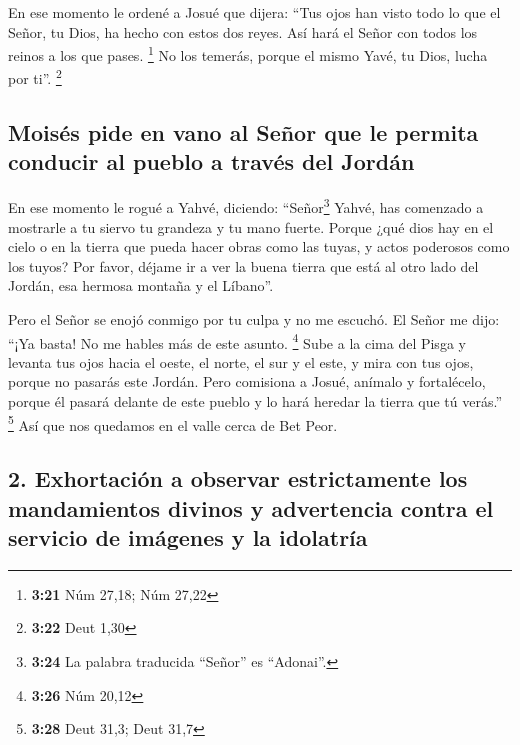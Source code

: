  En ese momento le ordené a Josué que dijera: ``Tus ojos
han visto todo lo que el Señor, tu Dios, ha hecho con estos dos reyes.
Así hará el Señor con todos los reinos a los que pases. \footnote{\textbf{3:21}
  Núm 27,18; Núm 27,22}  No los temerás, porque el mismo
Yavé, tu Dios, lucha por ti''. \footnote{\textbf{3:22} Deut 1,30}

\hypertarget{moisuxe9s-pide-en-vano-al-seuxf1or-que-le-permita-conducir-al-pueblo-a-travuxe9s-del-jorduxe1n}{%
\subsection{Moisés pide en vano al Señor que le permita conducir al
pueblo a través del
Jordán}\label{moisuxe9s-pide-en-vano-al-seuxf1or-que-le-permita-conducir-al-pueblo-a-travuxe9s-del-jorduxe1n}}

 En ese momento le rogué a Yahvé, diciendo:
 ``Señor\footnote{\textbf{3:24} La palabra traducida
  ``Señor'' es ``Adonai''.} Yahvé, has comenzado a mostrarle a tu siervo
tu grandeza y tu mano fuerte. Porque ¿qué dios hay en el cielo o en la
tierra que pueda hacer obras como las tuyas, y actos poderosos como los
tuyos?  Por favor, déjame ir a ver la buena tierra que
está al otro lado del Jordán, esa hermosa montaña y el Líbano''.

 Pero el Señor se enojó conmigo por tu culpa y no me
escuchó. El Señor me dijo: ``¡Ya basta! No me hables más de este asunto.
\footnote{\textbf{3:26} Núm 20,12}  Sube a la cima del
Pisga y levanta tus ojos hacia el oeste, el norte, el sur y el este, y
mira con tus ojos, porque no pasarás este Jordán.  Pero
comisiona a Josué, anímalo y fortalécelo, porque él pasará delante de
este pueblo y lo hará heredar la tierra que tú verás.'' \footnote{\textbf{3:28}
  Deut 31,3; Deut 31,7}  Así que nos quedamos en el valle
cerca de Bet Peor.

\hypertarget{exhortaciuxf3n-a-observar-estrictamente-los-mandamientos-divinos-y-advertencia-contra-el-servicio-de-imuxe1genes-y-la-idolatruxeda}{%
\subsection{2. Exhortación a observar estrictamente los mandamientos
divinos y advertencia contra el servicio de imágenes y la
idolatría}\label{exhortaciuxf3n-a-observar-estrictamente-los-mandamientos-divinos-y-advertencia-contra-el-servicio-de-imuxe1genes-y-la-idolatruxeda}}

